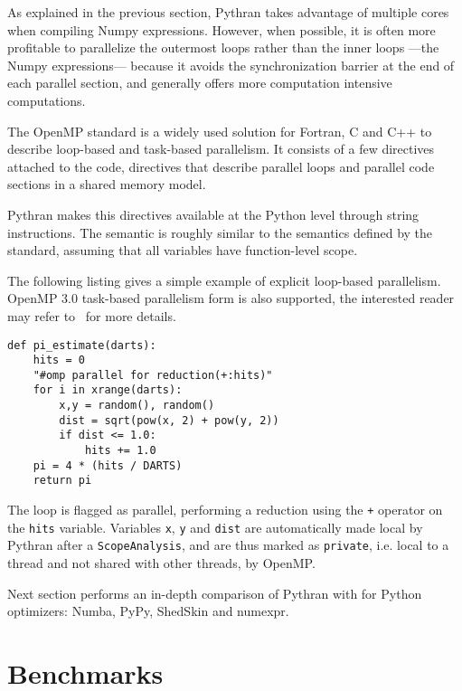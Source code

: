 \documentclass[10pt, onecolumn, preprint]{sigplanconf}
\begin{document}
As explained in the previous section, Pythran takes advantage of multiple cores
when compiling Numpy expressions. However, when possible, it is often more
profitable to parallelize the outermost loops rather than the inner loops
---the Numpy expressions--- because it avoids the synchronization barrier at
the end of each parallel section, and generally offers more computation
intensive computations.

The OpenMP standard\cite{openmp3.1} is a widely used solution for Fortran, C
and C++ to describe loop-based and task-based parallelism. It consists of a few
directives attached to the code, directives that describe parallel loops and parallel code
sections in a shared memory model.

Pythran makes this directives available at the Python level through string
instructions. The semantic is roughly similar to the semantics defined by the
standard, assuming that all variables have function-level scope.

The following listing gives a simple example of explicit loop-based 
parallelism. OpenMP 3.0 task-based parallelism form is also supported, the
interested reader may refer to~\cite{pyhpc2013} for more details.

\begin{lstlisting}
def pi_estimate(darts):
    hits = 0
    "#omp parallel for reduction(+:hits)"
    for i in xrange(darts):
        x,y = random(), random()
        dist = sqrt(pow(x, 2) + pow(y, 2))
        if dist <= 1.0:
            hits += 1.0
    pi = 4 * (hits / DARTS)
    return pi
\end{lstlisting}

The loop is flagged as parallel, performing a reduction using the \texttt{+}
operator on the \texttt{hits} variable. Variables \texttt{x}, \texttt{y} and
\texttt{dist} are automatically made local by Pythran after a
\texttt{ScopeAnalysis}, and are thus marked as \texttt{private}, i.e. local to
a thread and not shared with other threads, by OpenMP.


Next section performs an in-depth comparison of Pythran with for Python
optimizers: Numba, PyPy, ShedSkin and numexpr.


\section{Benchmarks}
\label{sec:benchmarks}
\end{document}
